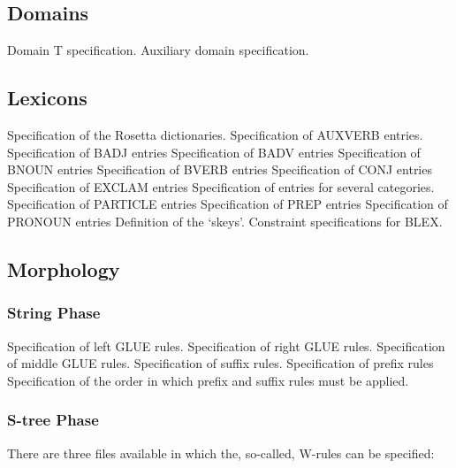 \subsection{Domains}
\bsc
{} Domain T specification.
 Auxiliary domain specification.
\esc
\subsection{Lexicons}
Specification of the Rosetta dictionaries.
\bsc
{} Specification of AUXVERB entries.
 Specification of BADJ entries
 Specification of BADV entries
 Specification of BNOUN entries
 Specification of BVERB entries
 Specification of CONJ entries
 Specification of EXCLAM entries
 Specification of entries for several categories.
 Specification of PARTICLE entries
 Specification of PREP entries
 Specification of PRONOUN entries
\esc
\bsc
{} Definition of the `skeys'.
 Constraint specifications for BLEX.
\esc
\subsection{Morphology}
\subsubsection{String Phase}
\bsc
{} Specification of left GLUE rules.
 Specification of right GLUE rules.
 Specification of middle GLUE rules.
 Specification of suffix rules.
 Specification of prefix rules
 Specification of the order in which prefix and suffix
                         rules must be applied.
\esc
\subsubsection{S-tree Phase}
There are three files available in which the, so-called, W-rules can be
specified:
\bsc
{}
\esc
